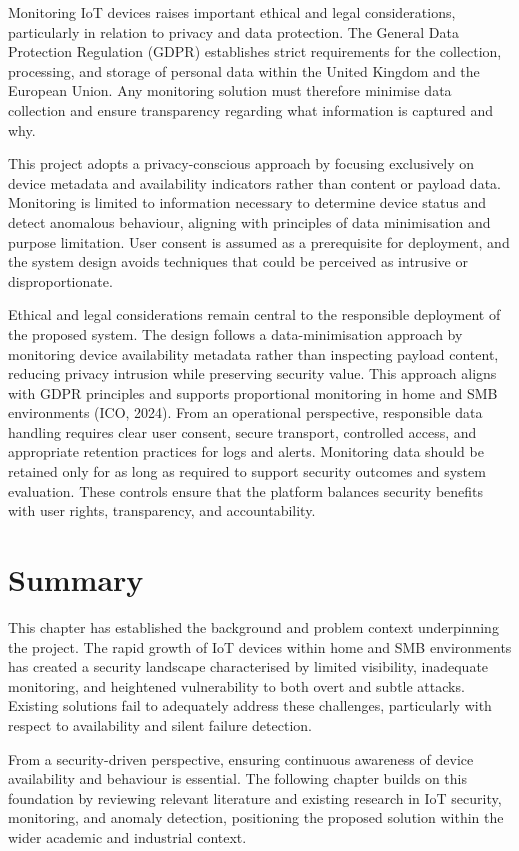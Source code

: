 Monitoring IoT devices raises important ethical and legal considerations, particularly in relation to privacy and data protection. The General Data Protection Regulation (GDPR) establishes strict requirements for the collection, processing, and storage of personal data within the United Kingdom and the European Union. Any monitoring solution must therefore minimise data collection and ensure transparency regarding what information is captured and why.

This project adopts a privacy-conscious approach by focusing exclusively on device metadata and availability indicators rather than content or payload data. Monitoring is limited to information necessary to determine device status and detect anomalous behaviour, aligning with principles of data minimisation and purpose limitation. User consent is assumed as a prerequisite for deployment, and the system design avoids techniques that could be perceived as intrusive or disproportionate.

Ethical and legal considerations remain central to the responsible deployment of the proposed system. The design follows a data-minimisation approach by monitoring device availability metadata rather than inspecting payload content, reducing privacy intrusion while preserving security value. This approach aligns with GDPR principles and supports proportional monitoring in home and SMB environments (ICO, 2024). From an operational perspective, responsible data handling requires clear user consent, secure transport, controlled access, and appropriate retention practices for logs and alerts. Monitoring data should be retained only for as long as required to support security outcomes and system evaluation. These controls ensure that the platform balances security benefits with user rights, transparency, and accountability.

\section{Summary}

This chapter has established the background and problem context underpinning the project. The rapid growth of IoT devices within home and SMB environments has created a security landscape characterised by limited visibility, inadequate monitoring, and heightened vulnerability to both overt and subtle attacks. Existing solutions fail to adequately address these challenges, particularly with respect to availability and silent failure detection.

From a security-driven perspective, ensuring continuous awareness of device availability and behaviour is essential. The following chapter builds on this foundation by reviewing relevant literature and existing research in IoT security, monitoring, and anomaly detection, positioning the proposed solution within the wider academic and industrial context.
